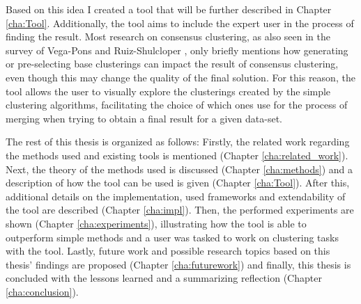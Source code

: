 Based on this idea I created a tool that will be further described in Chapter \ref{cha:Tool}. Additionally, the tool aims to include the expert user in the process of finding the result. Most research on consensus clustering, as also seen in the survey of Vega-Pons and Ruiz-Shulcloper \cite{survey1}, only briefly mentions how generating or pre-selecting base clusterings can impact the result of consensus clustering, even though this may change the quality of the final solution. For this reason, the tool allows the user to visually explore the clusterings created by the simple clustering algorithms, facilitating the choice of which ones use for the process of merging when trying to obtain a final result for a given data-set.

The rest of this thesis is organized as follows: Firstly, the related work regarding the methods used and existing tools is mentioned (Chapter \ref{cha:related_work}). Next, the theory of the methods used is discussed (Chapter \ref{cha:methods}) and a description of how the tool can be used is given (Chapter \ref{cha:Tool}). After this, additional details on the implementation, used frameworks and extendability of the tool are described (Chapter \ref{cha:impl}). Then, the performed experiments are shown (Chapter \ref{cha:experiments}), illustrating how the tool is able to outperform simple methods and a user was tasked to work on clustering tasks with the tool. Lastly, future work and possible research topics based on this thesis' findings are proposed (Chapter \ref{cha:futurework}) and finally, this thesis is concluded with the lessons learned and a summarizing reflection (Chapter \ref{cha:conclusion}).
